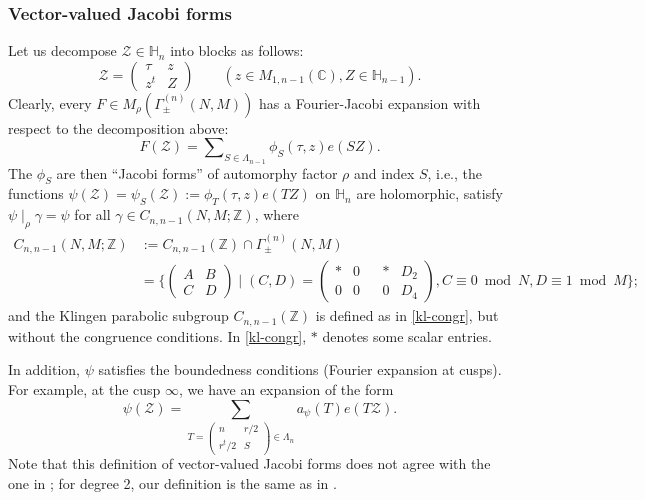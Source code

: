 \documentclass[11pt]{amsart}
\numberwithin{equation}{section}
\newcommand{\mbb}{\mathbb}
\newcommand{\mc}{\mathcal}
\newcommand{\qq}{\qquad}
\newcommand{\sumn}{\sum \nolimits}
\begin{document}
\subsubsection{Vector-valued Jacobi forms}\label{jacobi-vector}
Let us decompose
${\mathcal Z}\in \mbb  H_n$ into blocks as follows:
\begin{equation}\label{decompo}
\mathcal Z=\begin{pmatrix}\tau &z\\
z^t & Z \end{pmatrix}  \qq (z \in M_{1, n-1}(\mbb C), Z\in \mbb H_{n-1}).
\end{equation}
Clearly, every $F\in M_\rho( \Gamma_\pm^{(n)}(N, M))$ has a 
Fourier-Jacobi expansion with respect to the decomposition above: 
\[F({\mathcal Z})=\sumn_{S\in \Lambda_{n-1}} \phi_S(\tau,z) e(SZ).\]
The $\phi_S$ are then ``Jacobi forms'' of automorphy factor $\rho$ and
index $S$, i.e., the functions $\psi(\mc Z)=\psi_S({\mathcal Z}):= \phi_T(\tau,z)e (TZ)$
on $\mbb H_n$ are holomorphic, satisfy $\psi\mid_{\rho} \gamma=\psi$ for all 
$\gamma\in C_{n, n-1}(N, M;\mbb Z)$, where
\begin{align}
  C_{n, n-1}(N, M;\mbb Z) &:=  C_{n, n-1}(\mbb Z) \cap  \Gamma_\pm^{(n)}(N, M) \\ 
  &= \{\left(\begin{smallmatrix} A & B\\
C & D\end{smallmatrix}\right)\mid (C,D)= 
\left(\begin{smallmatrix} * & 0 &{}& * & D_2\\
0 & 0 & {} & 0 & D_4\end{smallmatrix}\right), C\equiv 0\bmod N, D\equiv 1\bmod M\}; \label{kl-congr}
\end{align}
and the Klingen parabolic subgroup $C_{n, n-1}(\mbb Z)$ is defined as in \eqref{kl-congr}, but without the congruence conditions.
In \eqref{kl-congr}, $*$ denotes some scalar entries. 

In addition, $\psi$ satisfies the boundedness conditions (Fourier expansion at cusps). For example, at the cusp $\infty$, we have an expansion of the form
\[ \psi(\mc Z)= \sum_{T = \left( \begin{smallmatrix} n & r/2 \\ r^t/2 & S \end{smallmatrix}\right) \in \Lambda_n} a_\psi(T) e(T \mc Z).\]
Note that this definition of vector-valued Jacobi forms does not agree
with the one in \cite{ziegler1989jacobi}; for degree 2, our definition is the same as in 
\cite{ibukiyama2011generalization}.
\end{document}
